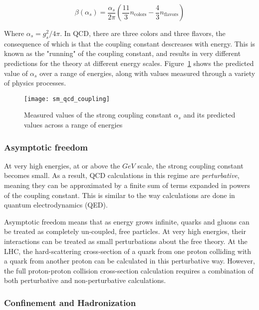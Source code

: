 \begin{equation}\label{eq:sm_qcd_beta}
    \beta\left(\alpha_s\right) = \frac{\alpha_s}{2\pi}\left(\frac{11}{3}n_{\text{colors}}-\frac{4}{3}n_{\text{flavors}}\right)
\end{equation}

Where $\alpha_s = g_s^2 / 4\pi$.
In QCD, there are three colors and three flavors, the consequence of which is that the coupling constant descreases with energy.
This is known as the "running" of the coupling constant, and results in very different predictions for the theory at different energy scales.
Figure~\ref{fig:sm_qcd_coupling} shows the predicted value of $\alpha_s$ over a range of energies,
along with values measured through a variety of physics processes.

\begin{figure}[h!]
    \centering
\texttt{[image: sm\_qcd\_coupling]}
\caption{Measured values of the strong coupling constant $\alpha_s$ and its predicted values across a range of energies}
\label{fig:sm_qcd_coupling}
\end{figure}\cite{sm-review-2014}

\subsubsection{Asymptotic freedom}

At very high energies, at or above the $GeV$ scale, the strong coupling constant becomes small.
As a result, QCD calculations in this regime are \textit{perturbative},
meaning they can be approximated by a finite sum of terms expanded in powers of the coupling constant.
This is similar to the way calculations are done in quantum electrodynamics (QED).

Asymptotic freedom means that as energy grows infinite,
quarks and gluons can be treated as completely un-coupled, free particles.
At very high energies, their interactions can be treated as small perturbations about the free theory.
At the LHC, the hard-scattering cross-section of a quark from one proton colliding with a quark from another proton
can be calculated in this perturbative way.
However, the full proton-proton collision cross-section calculation requires a combination of both perturbative and non-perturbative calculations.

\subsubsection{Confinement and Hadronization}

